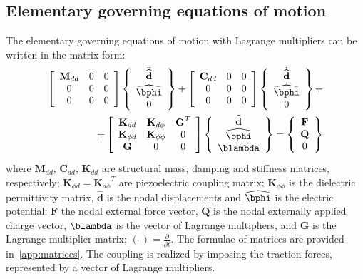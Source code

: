 \documentclass[a4paper,12pt]{article}
\begin{document}
\subsection{Elementary governing equations of motion}
\label{sec:motion}
The elementary governing equations of motion with Lagrange multipliers can be written in the matrix form:
\begin{eqnarray}
\left[
\begin{array}{ccc}
\textbf{M}_{dd} & 0 & 0\\
0 & 0 & 0\\
0 & 0 & 0
\end{array} \right]
\left \{
\begin{array}{c}
\ddot{\widehat{\textbf{d}}}\\
\ddot{\widehat{\bphi}}\\
0
\end{array} \right \}+
\left[
\begin{array}{ccc}
\textbf{C}_{dd} & 0 & 0\\
0 & 0 & 0\\
0 & 0 & 0
\end{array} \right]
\left \{
\begin{array}{c}
\dot{\widehat{\textbf{d}}}\\
\dot{\widehat{\bphi}}\\
0
\end{array} \right \}+\nonumber\\
+\left[
\begin{array}{ccc}
\textbf{K}_{dd} & \textbf{K}_{d\phi} & {\textbf{G}}^T\\
\textbf{K}_{\phi d} & \textbf{K}_{\phi \phi} & 0\\
\textbf{G} & 0 & 0
\end{array} \right]
\left \{
\begin{array}{c}
\widehat{\textbf{d}}\\
\widehat{\bphi}\\
\blambda
\end{array} \right \}=
\left \{
\begin{array}{c}
\textbf{F}\\
\textbf{Q}\\
0
\end{array} \right \}
\label{eq:motion}
\end{eqnarray}
where $\textbf{M}_{dd}$, $\textbf{C}_{dd}$, $\textbf{K}_{dd}$ are structural 
mass, damping and stiffness matrices, respectively; $\textbf{K}_{\phi 
d}={\textbf{K}_{d\phi}}^T$ are piezoelectric coupling matrix; $\textbf{K}_{\phi 
\phi}$ is the dielectric permittivity matrix, $\widehat{\textbf{d}}$ is the 
nodal displacements and $\widehat{\bphi}$ is the electric potential; 
$\textbf{F}$ the nodal external force vector, $\textbf{Q}$ is the nodal 
externally applied charge vector, $\blambda$ is the vector of Lagrange 
multipliers, and $\textbf{G}$ is the Lagrange multiplier matrix; $(\dot{\ 
})=\frac{\partial}{\partial t}$. The formulae of matrices are provided 
in~\ref{app:matrices}.
The coupling is realized by imposing the traction forces, represented by a vector of Lagrange multipliers. 
\end{document}

